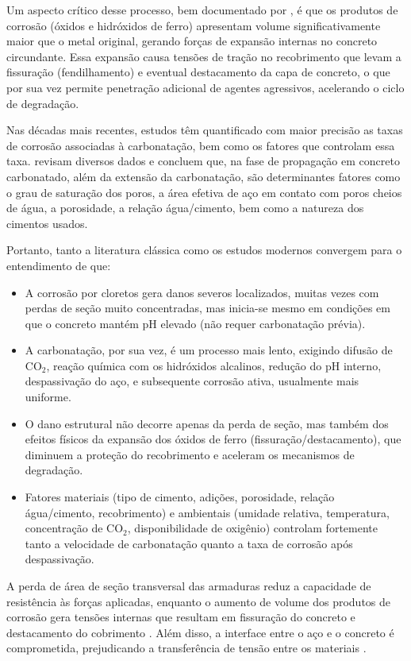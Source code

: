 Um aspecto crítico desse processo, bem documentado por \textcite{tuutti_corrosion_1982}, é que os produtos de corrosão (óxidos e hidróxidos de ferro) apresentam volume significativamente maior que o metal original, gerando forças de expansão internas no concreto circundante. Essa expansão causa tensões de tração no recobrimento que levam a fissuração (fendilhamento) e eventual destacamento da capa de concreto, o que por sua vez permite penetração adicional de agentes agressivos, acelerando o ciclo de degradação.

Nas décadas mais recentes, estudos têm quantificado com maior precisão as taxas de corrosão associadas à carbonatação, bem como os fatores que controlam essa taxa. \textcite{stefanoni_corrosion_2018} revisam diversos dados e concluem que, na fase de propagação em concreto carbonatado, além da extensão da carbonatação, são determinantes fatores como o grau de saturação dos poros, a área efetiva de aço em contato com poros cheios de água, a porosidade, a relação água/cimento, bem como a natureza dos cimentos usados.

Portanto, tanto a literatura clássica como os estudos modernos convergem para o entendimento de que:

\begin{itemize}
  \item A corrosão por cloretos gera danos severos localizados, muitas vezes com perdas de seção muito concentradas, mas inicia-se mesmo em condições em que o concreto mantém pH elevado (não requer carbonatação prévia).
  \item A carbonatação, por sua vez, é um processo mais lento, exigindo difusão de CO\(_2\), reação química com os hidróxidos alcalinos, redução do pH interno, despassivação do aço, e subsequente corrosão ativa, usualmente mais uniforme.
  \item O dano estrutural não decorre apenas da perda de seção, mas também dos efeitos físicos da expansão dos óxidos de ferro (fissuração/destacamento), que diminuem a proteção do recobrimento e aceleram os mecanismos de degradação.
  \item Fatores materiais (tipo de cimento, adições, porosidade, relação água/cimento, recobrimento) e ambientais (umidade relativa, temperatura, concentração de CO\(_2\), disponibilidade de oxigênio) controlam fortemente tanto a velocidade de carbonatação quanto a taxa de corrosão após despassivação.
\end{itemize}

A perda de área de seção transversal das armaduras reduz a capacidade de resistência às forças aplicadas, enquanto o aumento de volume dos produtos de corrosão gera tensões internas que resultam em fissuração do concreto e destacamento do cobrimento \cite{soltani_state---art_2019}. Além disso, a interface entre o aço e o concreto é comprometida, prejudicando a transferência de tensão entre os materiais \cite{vu_structural_2000, soltani_state---art_2019}.

